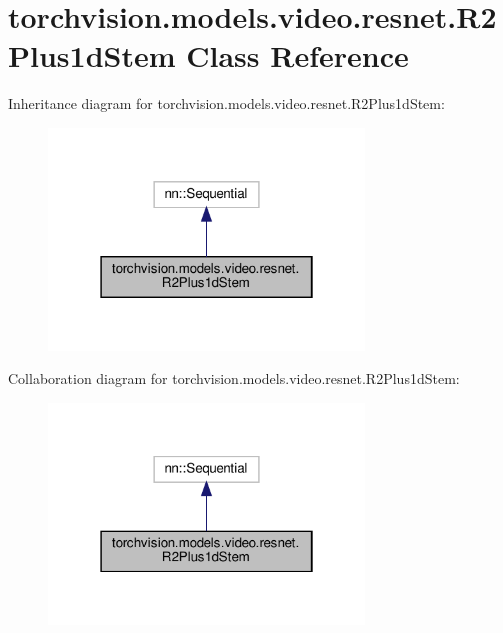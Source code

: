 \hypertarget{classtorchvision_1_1models_1_1video_1_1resnet_1_1R2Plus1dStem}{}\section{torchvision.\+models.\+video.\+resnet.\+R2\+Plus1d\+Stem Class Reference}
\label{classtorchvision_1_1models_1_1video_1_1resnet_1_1R2Plus1dStem}


Inheritance diagram for torchvision.\+models.\+video.\+resnet.\+R2\+Plus1d\+Stem\+:
\nopagebreak
\begin{figure}[H]
\begin{center}
\leavevmode
\includegraphics[width=238pt]{classtorchvision_1_1models_1_1video_1_1resnet_1_1R2Plus1dStem__inherit__graph}
\end{center}
\end{figure}


Collaboration diagram for torchvision.\+models.\+video.\+resnet.\+R2\+Plus1d\+Stem\+:
\nopagebreak
\begin{figure}[H]
\begin{center}
\leavevmode
\includegraphics[width=238pt]{classtorchvision_1_1models_1_1video_1_1resnet_1_1R2Plus1dStem__coll__graph}
\end{center}
\end{figure}
